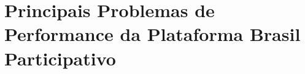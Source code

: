 \section{Principais Problemas de Performance da Plataforma Brasil Participativo}
\label{sec:principais_problemas_de_performance_da_plataforma_brasil_participativo}